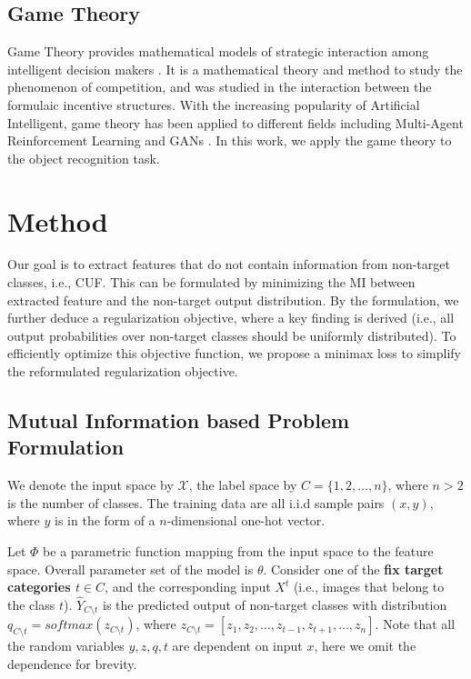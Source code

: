 \documentclass{article}
\theoremstyle{definition}
\begin{document}
\subsection{Game Theory}
Game Theory provides mathematical models of strategic interaction among intelligent decision makers \cite{myerson1991game}. It is a mathematical theory and method to study the phenomenon of competition, and was studied in \cite{osborne2004introduction} the interaction between the formulaic incentive structures. With the increasing popularity of Artificial Intelligent, game theory has been applied to different fields including Multi-Agent Reinforcement Learning \cite{bowling2000analysis} and GANs \cite{goodfellow2014generative, goodfellow2016nips}. In this work, we apply the game theory to the object recognition task.

\section{Method}
Our goal is to extract features that do not contain information from non-target classes, i.e., CUF. This can be formulated by minimizing the MI between extracted feature and the non-target output distribution. By the formulation, we further deduce a regularization objective, where a key finding is derived (i.e., all output probabilities over non-target classes should be uniformly distributed). To efficiently optimize this objective function, we propose a minimax loss to simplify the reformulated regularization objective. 

\subsection{Mutual Information based Problem Formulation}

 We denote the input space by $\mathcal{X}$, the label space by $C=\{1, 2, \dots, n \}$, where $n>2$ is the number of classes. 
 The training data are all i.i.d sample pairs $(x, y)$, where $y$ is in the form of a $n$-dimensional one-hot vector.

Let $\Phi$ be a parametric function mapping from the input space to the feature space. 
Overall parameter set of the model is $\theta$. Consider one of the \textbf{fix target categories $t\in C$}, and the corresponding input $X^t$ (i.e., images that belong to the class $t$). $\hat{Y}_{C\setminus t}$ is the predicted output of non-target classes with distribution $q_{C\setminus t}=softmax(z_{C\setminus t})$, where $z_{C\setminus t}=[z_1, z_2, \dots, z_{t-1}, z_{t+1}, \dots, z_n]$. Note that all the random variables $y, z, q, t$ are dependent on input $x$, here we omit the dependence for brevity.
\end{document}
